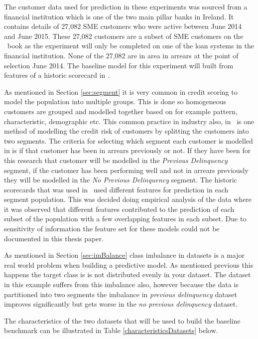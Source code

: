 The customer data used for prediction in these experiments was sourced from a financial institution \subjectname which is one of the two main pillar banks in Ireland. It contains details of 27,082 SME customers who were active between June 2014 and June 2015. These 27,082 customers are a subset of SME customers on the \subjectname\ book as the experiment will only be completed on one of the loan systems in the financial institution. None of the 27,082 are in area in arrears at the point of selection June 2014. The baseline model for this experiment will built from features of a historic scorecard in \subjectname.

As mentioned in Section \ref{sec:segment} it is very common in credit scoring to model the population into multiple groups. This is done so homogeneous customers are grouped and modelled together based on for example pattern, characteristic, demographic etc. This common practice in industry also, in \subjectname\ is one method of modelling the credit risk of customers by splitting the customers into two segments. The criteria for selecting which segment each customer is modelled in is if that customer has been in arrears previously or not. If they have been for this research that customer will be modelled in the \textit{Previous Delinquency} segment, if the customer has been performing well and not in arrears previously they will be modelled in the \textit{No Previous Delinquency} segment. The historic scorecards that was used in \subjectname\ used different features for prediction in each segment population. This was decided doing empirical analysis of the data where it was observed that different features contributed to the prediction of each subset of the population with a few overlapping features in each subset. Due to sensitivity of information the feature set for these models could not be documented in this thesis paper.

As mentioned in Section \ref{sec:imBalance} class imbalance in datasets is a major real world problem when building a predictive model. As mentioned previous this happens the target class is is not distributed evenly in your dataset. The dataset in this example suffers from this imbalance also, however because the data is partitioned into two segments the imbalance in \textit{previous delinquency} dataset improves significantly but gets worse in the \textit{no previous delinquency} dataset.

The characteristics of the two datasets that will be used to build the baseline benchmark can be illustrated in Table \ref{characteristicsDatasets} below.


